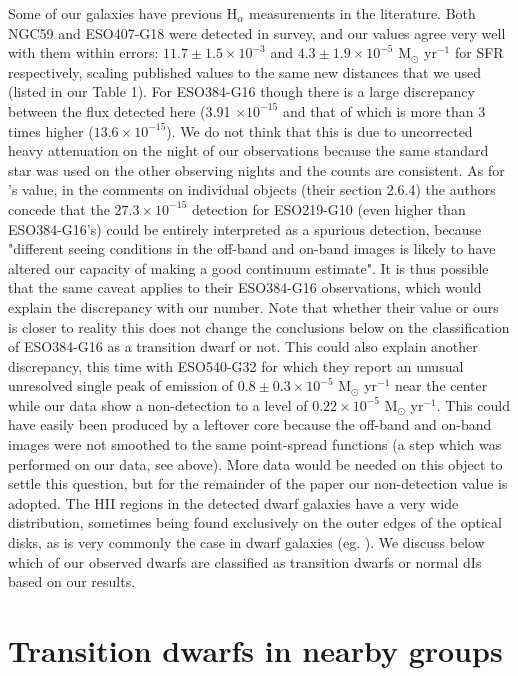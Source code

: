 \documentclass[12pt,preprint]{emulateapj}
\begin{document}
Some of our galaxies have previous H$_\alpha$ measurements in the literature. Both NGC59 and ESO407-G18 were detected in \cite{kl08} survey, 
and our values agree very well with them within errors:  $11.7\pm 1.5 \times 10^{-3}$ and $4.3\pm 1.9 \times 10^{-5}$ M$_{\odot}$ yr$^{-1}$ for SFR respectively, 
scaling \cite{kl08} published values to the same new distances that we used (listed in our Table 1). 
For ESO384-G16 though there is a large discrepancy between the flux detected here (3.91 $\times 10^{-15}$ and that of \cite{bou09} which is more than 3 times higher ($13.6 \times 10^{-15}$). We do not think that this is due to uncorrected heavy attenuation on the night of our observations because the same standard star was used on the other observing nights and the counts are consistent. As for \cite{bou09} 's value, in the comments on individual objects (their section 2.6.4) the authors concede that the $27.3 \times 10^{-15}$ detection for ESO219-G10 (even higher than ESO384-G16's) could be entirely interpreted as a spurious detection,
because "different seeing conditions in the off-band and on-band images is likely to have altered our capacity of making a good 
continuum estimate". It is thus possible that the same caveat applies to their ESO384-G16 observations, which would explain the discrepancy 
with our number. Note that whether their value or ours is closer to reality this does not change the conclusions below on the classification 
of ESO384-G16 as a transition dwarf or not. This could also explain another discrepancy, this time with ESO540-G32 for which they report an unusual unresolved single peak of emission of $0.8\pm 0.3 \times 10^{-5}$ M$_{\odot}$ yr$^{-1}$ near the center while our data show a non-detection to a level 
of $0.22 \times 10^{-5}$ M$_{\odot}$ yr$^{-1}$. This could have easily been produced by a leftover core because the off-band and on-band images 
were not smoothed to the same point-spread functions (a step which was performed on our data, see above). More data would be needed on this object 
to settle this question, but for the remainder of the paper our non-detection value is adopted.  
The HII regions in the detected dwarf galaxies have a very wide distribution, sometimes being found exclusively on the outer edges of the optical 
disks, as is very commonly the case in dwarf galaxies (eg. \cite{bha98}). 
We discuss below which of our observed dwarfs are classified as transition dwarfs or normal dIs based on our results. 


\section{Transition dwarfs in nearby groups}
\end{document}
